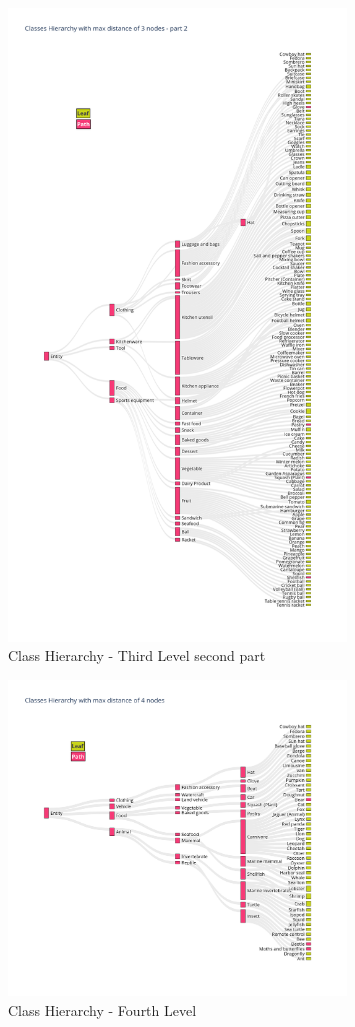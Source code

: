 \documentclass[11pt, a4paper, onecolumn]{article}
\begin{document}
\begin{appendices}
\begin{figure}[!ht]
		\includegraphics[width=0.8\textwidth]{lvl3_classes_pt2.png}
		\caption{\scriptsize Class Hierarchy - Third Level second part}
	\end{figure}
	
	\begin{figure}[!ht]
		\centering
		\includegraphics[width=0.8\textwidth]{lvl4_classes.png}
		\caption{\scriptsize Class Hierarchy - Fourth Level}
	\end{figure}
	

\end{appendices}
\end{document}
